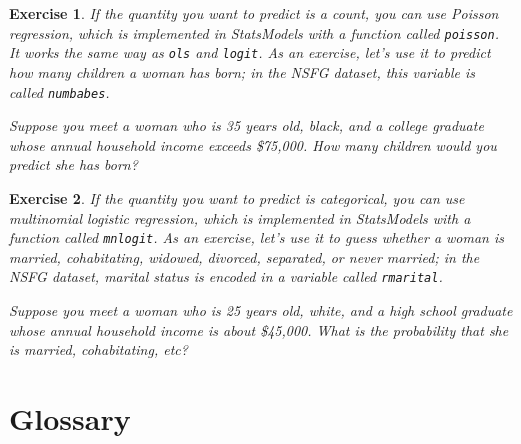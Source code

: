 \documentclass[12pt]{book}
\theoremstyle{exercise}
\newtheorem{exercise}{Exercise}[chapter]
\begin{document}
\begin{exercise}
If the quantity you want to predict is a count, you can use Poisson
regression, which is implemented in StatsModels with a function called
{\tt poisson}.  It works the same way as {\tt ols} and {\tt logit}.
As an exercise, let's use it to predict how many children a woman
has born; in the NSFG dataset, this variable is called {\tt numbabes}.%
%

Suppose you meet a woman who is 35 years old, black, and a college
graduate whose annual household income exceeds \$75,000.  How many
children would you predict she has born?
\end{exercise}


\begin{exercise}
If the quantity you want to predict is categorical, you can use
multinomial logistic regression, which is implemented in StatsModels
with a function called {\tt mnlogit}.  As an exercise, let's use it to
guess whether a woman is married, cohabitating, widowed, divorced,
separated, or never married; in the NSFG dataset, marital status is
encoded in a variable called {\tt rmarital}.%
%

Suppose you meet a woman who is 25 years old, white, and a high
school graduate whose annual household income is about \$45,000.
What is the probability that she is married, cohabitating, etc?
\end{exercise}




\section{Glossary}
\end{document}
